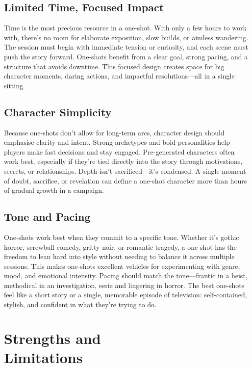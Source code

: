 \subsection*{Limited Time, Focused Impact}

Time is the most precious resource in a one-shot. With only a few hours to work with, there’s no room for elaborate exposition, slow builds, or aimless wandering. The session must begin with immediate tension or curiosity, and each scene must push the story forward. One-shots benefit from a clear goal, strong pacing, and a structure that avoids downtime. This focused design creates space for big character moments, daring actions, and impactful resolutions—all in a single sitting.

\subsection*{Character Simplicity}

Because one-shots don’t allow for long-term arcs, character design should emphasise clarity and intent. Strong archetypes and bold personalities help players make fast decisions and stay engaged. Pre-generated characters often work best, especially if they’re tied directly into the story through motivations, secrets, or relationships. Depth isn’t sacrificed—it’s condensed. A single moment of doubt, sacrifice, or revelation can define a one-shot character more than hours of gradual growth in a campaign.

\subsection*{Tone and Pacing}

One-shots work best when they commit to a specific tone. Whether it’s gothic horror, screwball comedy, gritty noir, or romantic tragedy, a one-shot has the freedom to lean hard into style without needing to balance it across multiple sessions. This makes one-shots excellent vehicles for experimenting with genre, mood, and emotional intensity. Pacing should match the tone—frantic in a heist, methodical in an investigation, eerie and lingering in horror. The best one-shots feel like a short story or a single, memorable episode of television: self-contained, stylish, and confident in what they’re trying to do.


\section[Strengths and Limitations]{Strengths and\\ Limitations}

